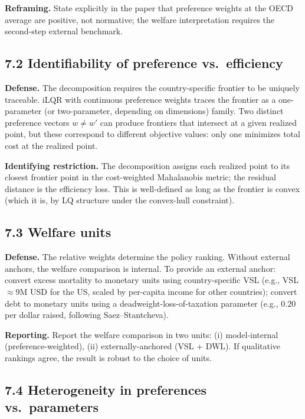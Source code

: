 \documentclass[11pt,a4paper]{article}
\begin{document}
\textbf{Reframing.} State explicitly in the paper that preference weights at the OECD average are positive, not normative; the welfare interpretation requires the second-step external benchmark.

\subsection*{7.2 Identifiability of preference vs.\ efficiency}

\textbf{Defense.} The decomposition requires the country-specific frontier to be uniquely traceable. iLQR with continuous preference weights traces the frontier as a one-parameter (or two-parameter, depending on dimensions) family. Two distinct preference vectors $w \neq w'$ can produce frontiers that intersect at a given realized point, but these correspond to different objective values: only one minimizes total cost at the realized point.

\textbf{Identifying restriction.} The decomposition assigns each realized point to its closest frontier point in the cost-weighted Mahalanobis metric; the residual distance is the efficiency loss. This is well-defined as long as the frontier is convex (which it is, by LQ structure under the convex-hull constraint).

\subsection*{7.3 Welfare units}

\textbf{Defense.} The relative weights determine the policy ranking. Without external anchors, the welfare comparison is internal. To provide an external anchor: convert excess mortality to monetary units using country-specific VSL (e.g., VSL $\approx 9$M USD for the US, scaled by per-capita income for other countries); convert debt to monetary units using a deadweight-loss-of-taxation parameter (e.g., $0.20$ per dollar raised, following Saez--Stantcheva).

\textbf{Reporting.} Report the welfare comparison in two units: (i) model-internal (preference-weighted), (ii) externally-anchored (VSL + DWL). If qualitative rankings agree, the result is robust to the choice of units.

\subsection*{7.4 Heterogeneity in preferences vs.\ parameters}
\end{document}
